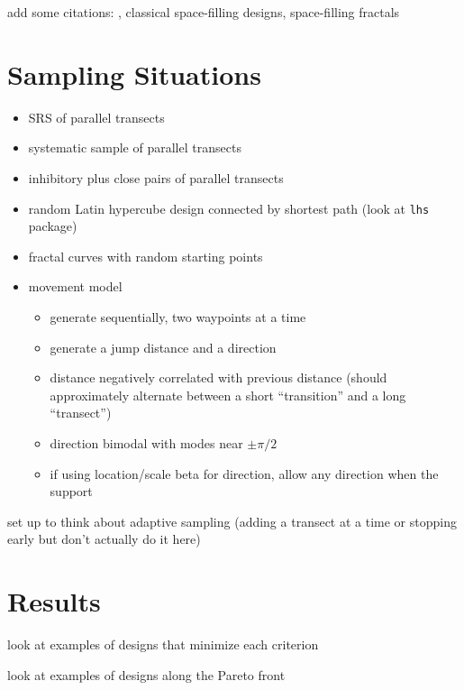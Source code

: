 \documentclass[12pt]{article}
\begin{document}
add some citations: \citet{lark}, classical space-filling designs,
space-filling fractals


\section{Sampling Situations}

\begin{itemize}

\item SRS of parallel transects

\item systematic sample of parallel transects

\item inhibitory plus close pairs of parallel transects

\item random Latin hypercube design connected by shortest path (look at
\texttt{lhs} package)

\item fractal curves with random starting points

\item movement model
\begin{itemize}
\item generate sequentially, two waypoints at a time
\item generate a jump distance and a direction
\item distance negatively correlated with previous distance (should
approximately alternate between a short ``transition'' and a long ``transect'')
\item direction bimodal with modes near \(\pm \pi / 2\)
\item if using location/scale beta for direction, allow any direction when the
support 
\end{itemize}

\end{itemize}

set up to think about adaptive sampling (adding a transect at a time or
stopping early but don't actually do it here)


\section{Results}

look at examples of designs that minimize each criterion

look at examples of designs along the Pareto front




\end{document}
